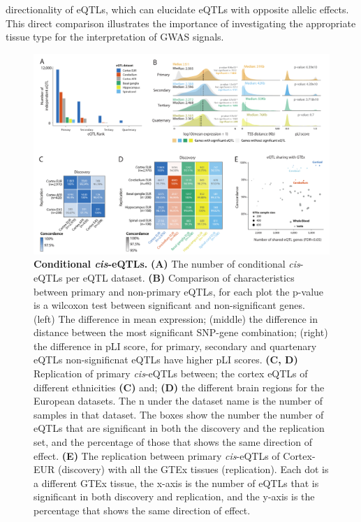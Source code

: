 directionality of eQTLs, which can elucidate eQTLs with opposite allelic effects\cite{fuUnravelingRegulatoryMechanisms2012}. This direct comparison illustrates the importance of investigating the appropriate tissue type for the interpretation of GWAS signals. 

\begin{figure}
	\includegraphics[width=\textwidth]{chapters/chapter5-brain-eqtls/img/2021-02-11-fig3-ciseqtls-v12.pdf}
	\caption{\textbf{Conditional \textit{cis}-eQTLs.} \textbf{(A)} The number of conditional \textit{cis}-eQTLs per eQTL dataset. \textbf{(B)} Comparison of characteristics between primary and non-primary eQTLs, for each plot the p-value is a wilcoxon test between significant and non-significant genes. (left) The difference in mean expression; (middle) the difference in distance between the most significant SNP-gene combination; (right) the difference in pLI score, for primary, secondary and quartenary eQTLs non-significnat eQTLs have higher pLI scores.  \textbf{(C, D)} Replication of primary \textit{cis}-eQTLs between; the cortex eQTLs of different ethnicities \textbf{(C)} and; \textbf{(D)} the different brain regions for the European datasets. The n under the dataset name is the number of samples in that dataset. The boxes show the number the number of eQTLs that are significant in both the discovery and the replication set, and the percentage of those that shows the same direction of effect. \textbf{(E)} The replication between primary \textit{cis}-eQTLs of Cortex-EUR (discovery) with all the GTEx tissues (replication). Each dot is a different GTEx tissue, the x-axis is the number of eQTLs that is significant in both discovery and replication, and the y-axis is the percentage that shows the same direction of effect. }
	\label{metabrain_fig3}
\end{figure}


